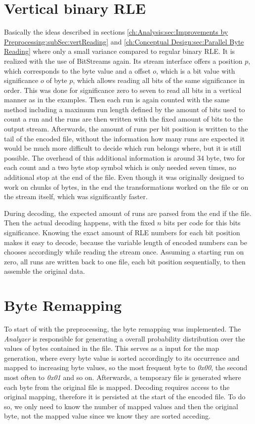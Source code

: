 \section{Vertical binary RLE}
\label{ch:Implementation:vertical rle}
\par{
	Basically the ideas described in sections \ref{ch:Analysis:sec:Improvements by Preprocessing:subSec:vertReading} and \ref{ch:Conceptual Design:sec:Parallel Byte Reading} where only a small variance compared to regular binary RLE. It is realized with the use of BitStreams again. Its stream interface offers a position $p$, which corresponds to the byte value and a offset $o$, which is a bit value with significance $o$ of byte $p$, which allows reading all bits of the same significance in order. This was done for significance zero to seven to read all bits in a vertical manner as in the examples. Then each run is again counted with the same method including a maximum run length defined by the amount of bits used to count a run and the runs are then written with the fixed amount of bits to the output stream. Afterwards, the amount of runs per bit position is written to the tail of the encoded file, without the information how many runs are expected it would be much more difficult to decide which run belongs where, but it is still possible. The overhead of this additional information is around 34 byte, two for each count and a two byte stop symbol which is only needed seven times, no additional stop at the end of the file. Even though it was originally designed to work on chunks of bytes, in the end the transformations worked on the file or on the stream itself, which was significantly faster.
}
\par{
	During decoding, the expected amount of runs are parsed from the end if the file. Then the actual decoding happens, with the fixed $n$ bits per code for this bits significance. Knowing the exact amount of RLE numbers for each bit position makes it easy to decode, because the variable length of encoded numbers can be chooses accordingly while reading the stream once. Assuming a starting run on zero, all runs are written back to one file, each bit position sequentially, to then assemble the original data.
}
\section{Byte Remapping}
\label{ch:Implementation:bytemapping}
\par{
	To start of with the preprocessing, the byte remapping was implemented. The \emph{Analyzer} is responsible for generating a overall probability distribution over the values of bytes contained in the file. This serves as a input for the map generation, where every byte value is sorted accordingly to its occurrence and mapped to increasing byte values, so the most frequent byte to \textit{0x00}, the second most often to \textit{0x01} and so on. Afterwards, a temporary file is generated where each byte from the original file is mapped. Decoding requires access to the original mapping, therefore it is persisted at the start of the encoded file. To do so, we only need to know the number of mapped values and then the original byte, not the mapped value since we know they are sorted acceding.
}
